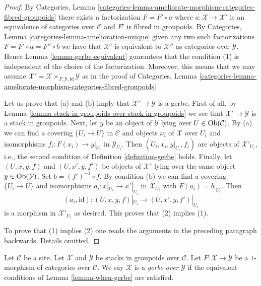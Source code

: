 \begin{proof}
By
Categories, Lemma
\ref{categories-lemma-ameliorate-morphism-categories-fibred-groupoids}
there exists a factorization $F = F' \circ a$ where
$a : \mathcal{X} \to \mathcal{X}'$ is an equivalence of categories over
$\mathcal{C}$ and $F'$ is fibred in groupoids. By
Categories, Lemma \ref{categories-lemma-amelioration-unique}
given any two such factorizations $F = F' \circ a = F'' \circ b$
we have that $\mathcal{X}'$ is equivalent to $\mathcal{X}''$ as
categories over $\mathcal{Y}$. Hence
Lemma \ref{lemma-gerbe-equivalent}
guarantees that the condition (1) is independent of the choice of the
factorization. Moreover, this means that we may assume
$\mathcal{X}' = \mathcal{X} \times_{F, \mathcal{Y}, \text{id}} \mathcal{Y}$
as in the proof of
Categories, Lemma
\ref{categories-lemma-ameliorate-morphism-categories-fibred-groupoids}

\medskip\noindent
Let us prove that (a) and (b) imply that $\mathcal{X}' \to \mathcal{Y}$
is a gerbe. First of all, by
Lemma \ref{lemma-stack-in-groupoids-over-stack-in-groupoids}
we see that $\mathcal{X}' \to \mathcal{Y}$ is a stack in groupoids.
Next, let $y$ be an object of $\mathcal{Y}$ lying over
$U \in \mathop{\mathrm{Ob}}\nolimits(\mathcal{C})$. By (a) we can find a covering
$\{U_i \to U\}$ in $\mathcal{C}$ and objects $x_i$ of $\mathcal{X}$
over $U_i$ and isomorphisms $f_i : F(x_i) \to y|_{U_i}$ in
$\mathcal{Y}_{U_i}$. Then $(U_i, x_i, y|_{U_i}, f_i)$ are objects
of $\mathcal{X}'_{U_i}$, i.e., the second condition of
Definition \ref{definition-gerbe}
holds. Finally, let $(U, x, y, f)$ and $(U, x', y, f')$ be objects
of $\mathcal{X}'$ lying over the same object $y \in \mathop{\mathrm{Ob}}\nolimits(\mathcal{Y})$.
Set $b = (f')^{-1} \circ f$. By condition (b) we can find a covering
$\{U_i \to U\}$ and isomorphisms $a_i : x|_{U_i} \to x'|_{U_i}$
in $\mathcal{X}_{U_i}$ with $F(a_i) = b|_{U_i}$. Then
$$
(a_i, \text{id}) : (U, x, y, f)|_{U_i} \to (U, x', y, f')|_{U_i}
$$
is a morphism in $\mathcal{X}'_{U_i}$ as desired. This proves that
(2) implies (1).

\medskip\noindent
To prove that (1) implies (2) one reads the arguments
in the preceding paragraph backwards. Details omitted.
\end{proof}

\begin{definition}
\label{definition-gerbe-over-stack-in-groupoids}
Let $\mathcal{C}$ be a site. Let $\mathcal{X}$
and $\mathcal{Y}$ be stacks in groupoids over $\mathcal{C}$.
Let $F : \mathcal{X} \to \mathcal{Y}$ be a $1$-morphism of categories
over $\mathcal{C}$. We say $\mathcal{X}$ is a {\it gerbe over} $\mathcal{Y}$
if the equivalent conditions of
Lemma \ref{lemma-when-gerbe}
are satisfied.
\end{definition}

